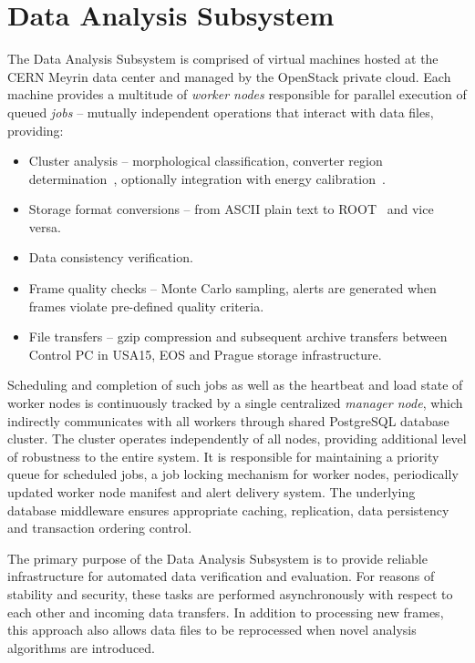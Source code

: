 

\section{\label{sec:analysis}Data Analysis Subsystem}
The Data Analysis Subsystem is comprised of virtual machines hosted at the CERN Meyrin data center and managed by the OpenStack private cloud. Each machine provides a multitude of \textit{worker nodes} responsible for parallel execution of queued \textit{jobs} -- mutually independent operations that interact with data files, providing:
~
\begin{itemize}
  \item Cluster analysis -- morphological classification, converter region determination~\cite{Holy2008}, optionally integration with energy calibration~\cite{Jakubek2011}.
  \item Storage format conversions -- from ASCII plain text to ROOT~\cite{ROOT} and vice versa.
  \item Data consistency verification.
  \item Frame quality checks -- Monte Carlo sampling, alerts are generated when frames violate pre-defined quality criteria.
  \item File transfers -- gzip compression and subsequent archive transfers between Control PC in USA15, EOS and Prague storage infrastructure.
\end{itemize}

Scheduling and completion of such jobs as well as the heartbeat and load state of worker nodes is continuously tracked by a single centralized \textit{manager node}, which indirectly communicates with all workers through shared PostgreSQL database cluster. The cluster operates independently of all nodes, providing additional level of robustness to the entire system. It is responsible for maintaining a priority queue for scheduled jobs, a job locking mechanism for worker nodes, periodically updated worker node manifest and alert delivery system. The underlying database middleware ensures appropriate caching, replication, data persistency and transaction ordering control.

The primary purpose of the Data Analysis Subsystem is to provide reliable infrastructure for automated data verification and evaluation. For reasons of stability and security, these tasks are performed asynchronously with respect to each other and incoming data transfers. In addition to processing new frames, this approach also allows data files to be reprocessed when novel analysis algorithms are introduced.

